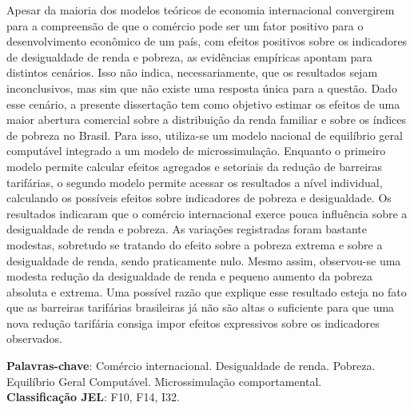 

\begin{resumo}
	\SingleSpacing
	
	Apesar da maioria dos modelos teóricos de economia internacional convergirem para a compreensão de que o comércio pode ser um fator positivo para o desenvolvimento econômico de um país, com efeitos positivos sobre os indicadores de desigualdade de renda e pobreza, as evidências empíricas apontam para distintos cenários. Isso não indica, necessariamente, que os resultados sejam inconclusivos, mas sim que não existe uma resposta única para a questão. Dado esse cenário, a presente dissertação tem como objetivo estimar os efeitos de uma maior abertura comercial sobre a distribuição da renda familiar e sobre os índices de pobreza no Brasil. Para isso, utiliza-se um modelo nacional de equilíbrio geral computável integrado a um modelo de microssimulação. Enquanto o primeiro modelo permite calcular efeitos agregados e setoriais da redução de barreiras tarifárias, o segundo modelo permite acessar os resultados a nível individual, calculando os possíveis efeitos sobre indicadores de pobreza e desigualdade. Os resultados indicaram que o comércio internacional exerce pouca influência sobre a desigualdade de renda e pobreza. As variações registradas foram bastante modestas, sobretudo se tratando do efeito sobre a pobreza extrema e sobre a desigualdade de renda, sendo praticamente nulo. Mesmo assim, observou-se uma modesta redução da desigualdade de renda e pequeno aumento da pobreza absoluta e extrema. Uma possível razão que explique esse resultado esteja no fato que as barreiras tarifárias brasileiras já não são altas o suficiente para que uma nova redução tarifária consiga impor efeitos expressivos sobre os indicadores observados.
	
	\noindent 
	\textbf{Palavras-chave}: Comércio internacional. Desigualdade de renda. Pobreza. Equilíbrio Geral Computável. Microssimulação comportamental. \\
	\textbf{Classificação JEL}: F10, F14, I32.
\end{resumo}


